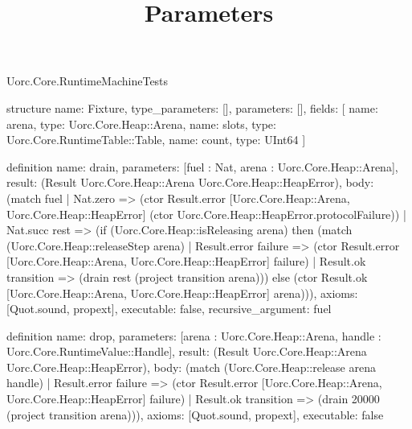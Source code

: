 \begin{lexlean}{Uorc.Core.RuntimeMachineTests}
\title{Parameters}
\begin{semanticmodule}
structure{
  name: Fixture,
  type_parameters: [],
  parameters: [],
  fields: [
    {name: arena, type: Uorc.Core.Heap::Arena},
    {name: slots, type: Uorc.Core.RuntimeTable::Table},
    {name: count, type: UInt64}
  ]
}

definition{
  name: drain,
  parameters: [fuel : Nat, arena : Uorc.Core.Heap::Arena],
  result: (Result Uorc.Core.Heap::Arena Uorc.Core.Heap::HeapError),
  body: (match fuel
    | Nat.zero => (ctor Result.error [Uorc.Core.Heap::Arena, Uorc.Core.Heap::HeapError] (ctor Uorc.Core.Heap::HeapError.protocolFailure))
    | Nat.succ rest => (if (Uorc.Core.Heap::isReleasing arena) then (match (Uorc.Core.Heap::releaseStep arena)
      | Result.error failure => (ctor Result.error [Uorc.Core.Heap::Arena, Uorc.Core.Heap::HeapError] failure)
      | Result.ok transition => (drain rest (project transition arena))) else (ctor Result.ok [Uorc.Core.Heap::Arena, Uorc.Core.Heap::HeapError] arena))),
  axioms: [Quot.sound, propext],
  executable: false,
  recursive_argument: fuel
}

definition{
  name: drop,
  parameters: [arena : Uorc.Core.Heap::Arena, handle : Uorc.Core.RuntimeValue::Handle],
  result: (Result Uorc.Core.Heap::Arena Uorc.Core.Heap::HeapError),
  body: (match (Uorc.Core.Heap::release arena handle)
    | Result.error failure => (ctor Result.error [Uorc.Core.Heap::Arena, Uorc.Core.Heap::HeapError] failure)
    | Result.ok transition => (drain 20000 (project transition arena))),
  axioms: [Quot.sound, propext],
  executable: false
}


\end{semanticmodule}
\end{lexlean}
